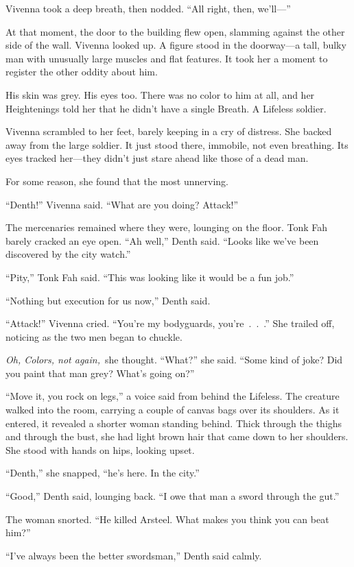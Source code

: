 Vivenna took a deep breath, then nodded. “All right, then, we’ll—”

At that moment, the door to the building flew open, slamming against the other side of the wall. Vivenna looked up. A figure stood in the doorway—a tall, bulky man with unusually large muscles and flat features. It took her a moment to register the other oddity about him.

His skin was grey. His eyes too. There was no color to him at all, and her Heightenings told her that he didn’t have a single Breath. A Lifeless soldier.

Vivenna scrambled to her feet, barely keeping in a cry of distress. She backed away from the large soldier. It just stood there, immobile, not even breathing. Its eyes tracked her—they didn’t just stare ahead like those of a dead man.

For some reason, she found that the most unnerving.

“Denth!” Vivenna said. “What are you doing? Attack!”

The mercenaries remained where they were, lounging on the floor. Tonk Fah barely cracked an eye open. “Ah well,” Denth said. “Looks like we’ve been discovered by the city watch.”

“Pity,” Tonk Fah said. “This was looking like it would be a fun job.”

“Nothing but execution for us now,” Denth said.

“Attack!” Vivenna cried. “You’re my bodyguards, you’re~.~.~.” She trailed off, noticing as the two men began to chuckle.

\textit{Oh, Colors, not again,}~she thought. “What?” she said. “Some kind of joke? Did you paint that man grey? What’s going on?”

“Move it, you rock on legs,” a voice said from behind the Lifeless. The creature walked into the room, carrying a couple of canvas bags over its shoulders. As it entered, it revealed a shorter woman standing behind. Thick through the thighs and through the bust, she had light brown hair that came down to her shoulders. She stood with hands on hips, looking upset.

“Denth,” she snapped, “he’s here. In the city.”

“Good,” Denth said, lounging back. “I owe that man a sword through the gut.”

The woman snorted. “He killed Arsteel. What makes you think you can beat him?”

“I’ve always been the better swordsman,” Denth said calmly.

